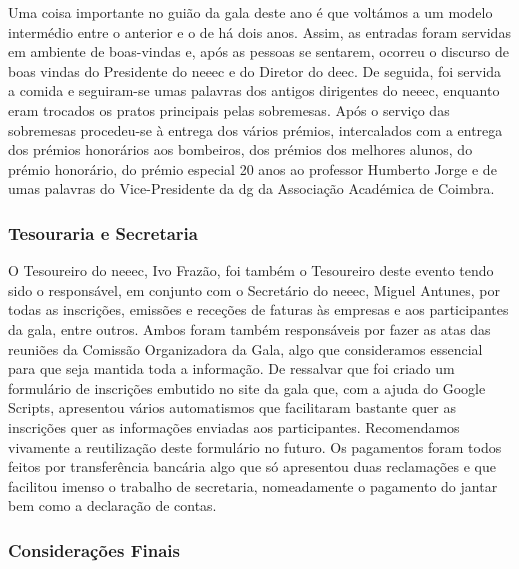 Uma coisa importante no guião da gala deste ano é que voltámos a um modelo intermédio entre o anterior e o de há dois anos. Assim, as entradas foram servidas em ambiente de boas-vindas e, após as pessoas se sentarem, ocorreu o discurso de boas vindas do Presidente do \acrshort{neeec} e do Diretor do \acrshort{deec}. De seguida, foi servida a comida e seguiram-se umas palavras dos antigos dirigentes do \acrshort{neeec}, enquanto eram trocados os pratos principais pelas sobremesas. Após o serviço das sobremesas procedeu-se à entrega dos vários prémios, intercalados com a entrega dos prémios honorários aos bombeiros, dos prémios dos melhores alunos, do prémio honorário, do prémio especial 20 anos ao professor Humberto Jorge e de umas palavras do Vice-Presidente da \acrlong{dg} da Associação Académica de Coimbra.

\subsubsection{Tesouraria e Secretaria}

O Tesoureiro do \acrshort{neeec}, Ivo Frazão, foi também o Tesoureiro deste evento tendo sido o responsável, em conjunto com o Secretário do \acrshort{neeec}, Miguel Antunes, por todas as inscrições, emissões e receções de faturas às empresas e aos participantes da gala, entre outros. Ambos foram também responsáveis por fazer as atas das reuniões da Comissão Organizadora da Gala, algo que consideramos essencial para que seja mantida toda a informação. De ressalvar que foi criado um formulário de inscrições embutido no site da gala que, com a ajuda do Google Scripts, apresentou vários automatismos que facilitaram bastante quer as inscrições quer as informações enviadas aos participantes. Recomendamos vivamente a reutilização deste formulário no futuro. Os pagamentos foram todos feitos por transferência bancária algo que só apresentou duas reclamações e que facilitou imenso o trabalho de secretaria, nomeadamente o pagamento do jantar bem como a declaração de contas.

\subsubsection{Considerações Finais}

